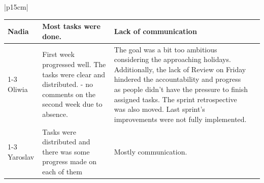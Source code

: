 \begin{table}[H]
    \centering
    \begin{tabular}{|p{15cm}|} 
        \hline
        \begin{table}[H]
            \begin{tabular}{|p{1.75cm}|p{4cm}|p{4cm}|p{4cm}|}
                \hline
                \cellcolor[HTML]{d4d4d4} Nadia & Most tasks were done. & Lack of communication &  \\
                \cline{1-3}
                \cellcolor[HTML]{d4d4d4} Oliwia & First week progressed well. The tasks were clear and distributed. - no comments on the second week due to absence. & The goal was a bit too ambitious considering the approaching holidays. Additionally, the lack of Review on Friday hindered the accountability and progress as people didn't have the pressure to finish assigned tasks. The sprint retrospective was also moved. Last sprint's improvements were not fully implemented. &  \\
                \cline{1-3}
                \cellcolor[HTML]{d4d4d4} Yaroslav & Tasks were distributed and there was some progress made on each of them & Mostly communication. &  \\
                \hline
            \end{tabular}
        \end{table}
        \\
        \hline
    \end{tabular}
\end{table}


